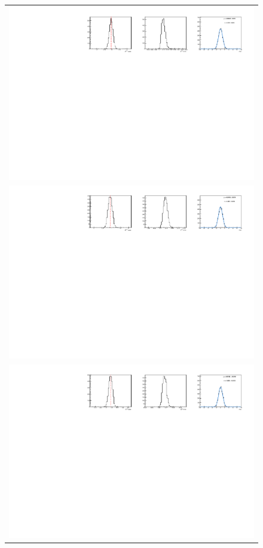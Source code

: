 \begin{figure}
  \centering
  \begin{tabular}{c}
\includegraphics[width=\textwidth]{ANA_resources/Plots/Data_fit/FitterBias//A_signal_KK_run2.pdf} \\
\includegraphics[width=\textwidth]{ANA_resources/Plots/Data_fit/FitterBias//R_signal_KK_run2.pdf} \\
\includegraphics[width=\textwidth]{ANA_resources/Plots/Data_fit/FitterBias//A_Bs_KK_run2.pdf} \\

\end{tabular}
\end{figure}
